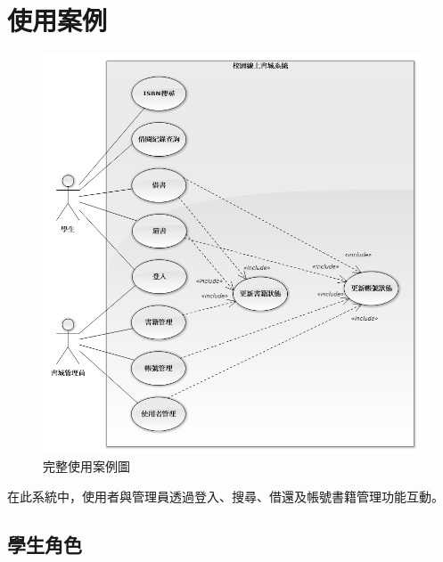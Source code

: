\chapter{使用案例}

\begin{figure}[ht]
    \centering
    \includegraphics[width=\linewidth]{image/使用案例.png}
    \captionsetup{justification=centering}
    \caption{完整使用案例圖}
\end{figure}

在此系統中，使用者與管理員透過登入、搜尋、借還及帳號書籍管理功能互動。

\clearpage

\section{學生角色}

